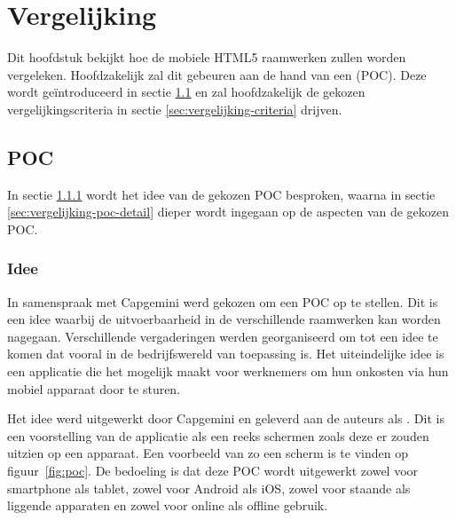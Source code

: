 \chapter{Vergelijking}
\label{chap:vergelijking}

Dit hoofdstuk bekijkt hoe de mobiele HTML5 raamwerken zullen worden vergeleken.
Hoofdzakelijk zal dit gebeuren aan de hand van een  (POC).
Deze wordt geïntroduceerd in sectie \ref{sec:vergelijking-poc} en zal hoofdzakelijk de gekozen vergelijkingscriteria in sectie \ref{sec:vergelijking-criteria} drijven.


\section{POC}
\label{sec:vergelijking-poc}
In sectie \ref{sec:vergelijking-poc-idee} wordt het idee van de gekozen POC besproken, waarna in sectie \ref{sec:vergelijking-poc-detail} dieper wordt ingegaan op de aspecten van de gekozen POC.

\subsection{Idee}
\label{sec:vergelijking-poc-idee}

In samenspraak met Capgemini werd gekozen om een POC op te stellen.
Dit is een idee waarbij de uitvoerbaarheid in de verschillende raamwerken kan worden nagegaan.
Verschillende vergaderingen werden georganiseerd om tot een idee te komen dat vooral in de bedrijfswereld van toepassing is.
Het uiteindelijke idee is een applicatie die het mogelijk maakt voor werknemers om hun onkosten via hun mobiel apparaat door te sturen.

Het idee werd uitgewerkt door Capgemini en geleverd aan de auteurs als .
Dit is een voorstelling van de applicatie als een reeks schermen zoals deze er zouden uitzien op een apparaat. 
Een voorbeeld van zo een scherm is te vinden op figuur~\ref{fig:poc}. 
De bedoeling is dat deze POC wordt uitgewerkt zowel voor smartphone als tablet, zowel voor Android als iOS, zowel voor staande als liggende apparaten en zowel voor online als offline gebruik.

